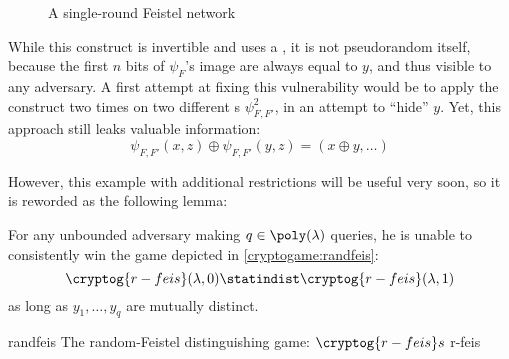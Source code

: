 \begin{figure}
    \centering

    
    \label{fig:feistel}
    \caption{A single-round Feistel network}
\end{figure}

While this construct is invertible and uses a \prf{}, it is not pseudorandom itself, because the first $n$ bits of $\psi_F$'s image are always equal to $y$, and thus visible to any adversary. A first attempt at fixing this vulnerability would be to apply the construct two times on two different \prf{}s $\psi^2_{F, F'}$, in an attempt to ``hide'' $y$. Yet, this approach still leaks valuable information:
\[
    \psi_{F, F'}(x, z) \oplus \psi_{F, F'}(y, z) = (x \oplus y, \dots)
\]

However, this example with additional restrictions will be useful very soon, so it is reworded as the following lemma:

\begin{lemma}
    For any unbounded adversary making $q \in \poly(\lambda)$ queries, he is unable to consistently win the game depicted in \ref{cryptogame:randfeis}:
    \[
        \cryptog{r-feis}(\lambda, 0) \statindist \cryptog{r-feis}(\lambda, 1)
    \]
    as long as $y_1, \ldots, y_q$ are mutually distinct.
\end{lemma}

\begin{cryptogame}
    {randfeis}
    {The random-Feistel distinguishing game: $\cryptog{r-feis}s$}
    {r-feis}


    \cseqdelay
    \cseqbeginloop
    \cseqendloop
    \cseqdelay


\end{cryptogame}

